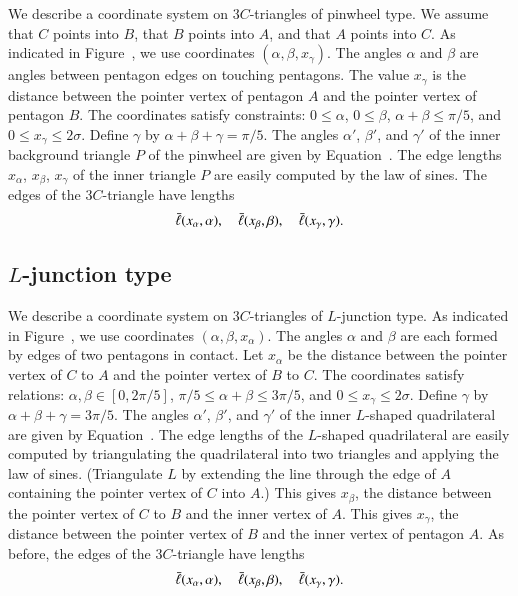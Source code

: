 We describe a coordinate system on $3C$-triangles of pinwheel type.
We assume that $C$ points into $B$, that $B$ points into $A$, and that
$A$ points into $C$.  As indicated in Figure~,
we use coordinates $(\alpha,\beta,x_\gamma)$.  The angles $\alpha$ and
$\beta$ are angles between pentagon edges on touching pentagons.  The
value $x_\gamma$ is the distance between the pointer vertex of
pentagon $A$ and the pointer vertex of pentagon $B$.  The coordinates
satisfy constraints: $0\le\alpha$, $0\le\beta$, $\alpha+\beta\le
\pi/5$, and $0\le x_\gamma\le 2\sigma$.  Define $\gamma$ by
$\alpha+\beta+\gamma=\pi/5$.  The angles $\alpha'$, $\beta'$, and
$\gamma'$ of the inner background triangle $P$ of the pinwheel are
given by Equation~.  The edge lengths $x_\alpha$,
$x_\beta$, $x_\gamma$ of the inner triangle $P$ are easily computed by
the law of sines.  The edges of the $3C$-triangle have lengths
\[
\bar\ell(x_\alpha,\alpha),\quad \bar\ell(x_\beta,\beta),\quad \bar\ell(x_\gamma,\gamma).
\]



\subsection{$L$-junction type}

We describe a coordinate system on $3C$-triangles of $L$-junction
type.  As indicated in Figure~, we use coordinates
$(\alpha,\beta,x_\alpha)$.  The angles $\alpha$ and $\beta$ are each
formed by edges of two pentagons in contact.  Let $x_\alpha$ be the
distance between the pointer vertex of $C$ to $A$ and the pointer
vertex of $B$ to $C$.  The coordinates satisfy relations:
$\alpha,\beta\in [0,2\pi/5]$, $\pi/5\le\alpha+\beta\le 3\pi/5$, and
$0\le x_\gamma\le 2\sigma$.  Define $\gamma$ by
$\alpha+\beta+\gamma=3\pi/5$.  The angles $\alpha'$, $\beta'$, and
$\gamma'$ of the inner $L$-shaped quadrilateral are given by
Equation~.  The edge lengths of the $L$-shaped
quadrilateral are easily computed by triangulating the quadrilateral
into two triangles and applying the law of sines.  (Triangulate
$L$ by extending the line through the edge of $A$ containing the
pointer vertex of $C$ into $A$.)  This gives
$x_\beta$, the distance between the pointer vertex of $C$ to $B$ and
the inner vertex of $A$.  This gives $x_\gamma$, the distance between
the pointer vertex of $B$ and the inner vertex of pentagon $A$.
As before, the edges of the $3C$-triangle have lengths
\[
\bar\ell(x_\alpha,\alpha),\quad \bar\ell(x_\beta,\beta),\quad \bar\ell(x_\gamma,\gamma).
\]

